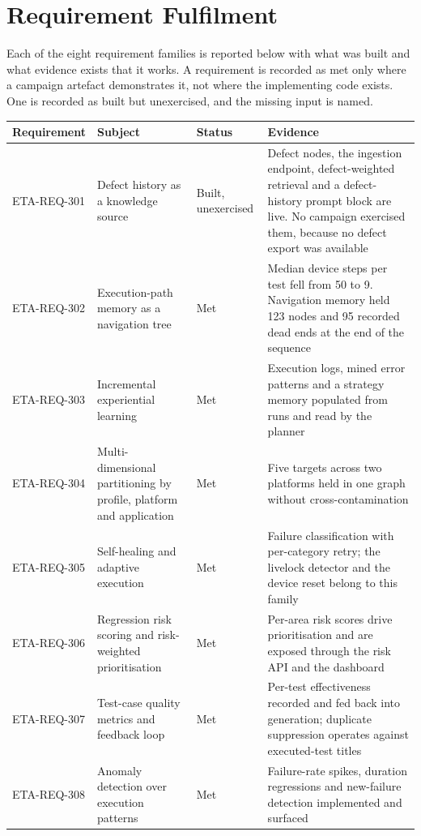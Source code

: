 \section{Requirement Fulfilment}
\label{sec:fulfilment}

Each of the eight requirement families is reported below with what was built
and what evidence exists that it works. A requirement is recorded as met only
where a campaign artefact demonstrates it, not where the implementing code
exists. One is recorded as built but unexercised, and the missing input is
named.

\begin{table}[H]
  \centering\small
  \setlength{\tabcolsep}{5pt}
  \begin{tabularx}{\textwidth}{@{}>{\hsize}Y>{\hsize}Y>{\hsize}Y>{\hsize}Y@{}}
    \toprule
    Requirement & Subject & Status & Evidence \\
    \midrule
    ETA-REQ-301 & Defect history as a knowledge source & Built, unexercised & Defect nodes, the ingestion endpoint, defect-weighted retrieval and a defect-history prompt block are live. No campaign exercised them, because no defect export was available \\
    \addlinespace
    ETA-REQ-302 & Execution-path memory as a navigation tree & Met & Median device steps per test fell from 50 to 9. Navigation memory held 123 nodes and 95 recorded dead ends at the end of the sequence \\
    \addlinespace
    ETA-REQ-303 & Incremental experiential learning & Met & Execution logs, mined error patterns and a strategy memory populated from runs and read by the planner \\
    \addlinespace
    ETA-REQ-304 & Multi-dimensional partitioning by profile, platform and application & Met & Five targets across two platforms held in one graph without cross-contamination \\
    \addlinespace
    ETA-REQ-305 & Self-healing and adaptive execution & Met & Failure classification with per-category retry; the livelock detector and the device reset belong to this family \\
    \addlinespace
    ETA-REQ-306 & Regression risk scoring and risk-weighted prioritisation & Met & Per-area risk scores drive prioritisation and are exposed through the risk API and the dashboard \\
    \addlinespace
    ETA-REQ-307 & Test-case quality metrics and feedback loop & Met & Per-test effectiveness recorded and fed back into generation; duplicate suppression operates against executed-test titles \\
    \addlinespace
    ETA-REQ-308 & Anomaly detection over execution patterns & Met & Failure-rate spikes, duration regressions and new-failure detection implemented and surfaced \\
    \bottomrule
  \end{tabularx}
\end{table}

